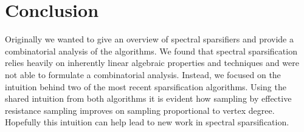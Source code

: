 \documentclass[12pt,twoside]{article}
\begin{document}
\section{Conclusion}

Originally we wanted to give an overview of spectral sparsifiers and provide a combinatorial analysis of the algorithms. We found that spectral sparsification relies heavily on inherently linear algebraic properties and techniques and were not able to formulate a combinatorial analysis. Instead, we focused on the intuition behind two of the most recent sparsification algorithms. Using the shared intuition from both algorithms it is evident how sampling by effective resistance sampling improves on sampling proportional to vertex degree. Hopefully this intuition can help lead to new work in spectral sparsification. 



\end{document}

